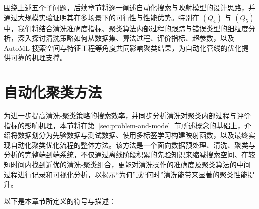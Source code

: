 \documentclass[10pt]{article} %
\numberwithin{equation}{section}
\begin{document}
\textcolor[rgb]{0.00,0.07,1.00}{围绕上述五个子问题，后续章节将逐一阐述自动化搜索与映射模型的设计思路，并通过大规模实验证明其在多场景下的可行性与性能优势。特别在 \((Q_4)\) 与 \((Q_5)\) 中，我们将结合清洗准确度指标、聚类算法内部过程的跟踪与错误类型的细粒度分析，深入探讨清洗策略如何从数据集、算法过程、评价指标、超参数，以及 AutoML 搜索空间与特征工程等角度共同影响聚类结果，为自动化管线的优化提供可靠的机理支撑。}  


\section{自动化聚类方法}
\label{sec:autoML}

为进一步提高清洗-聚类策略的搜索效率，并同步分析清洗对聚类内部过程与评价指标的影响机理，本节将在第~\ref{sec:problem-and-model} 节所述概念的基础上，介绍将数据划分为先验数据与测试数据、使用多标签学习构建映射函数，以及最终实现自动化聚类优化流程的整体方法。该方法是一个面向数据预处理、清洗、聚类与分析的完整端到端系统，不仅通过离线阶段积累的先验知识来缩减搜索空间、在较短时间内找到近优的清洗-聚类组合，更能对清洗操作的准确度及聚类算法的中间过程进行记录和可视化分析，以揭示“为何”或“何时”清洗能带来显著的聚类性能提升。

以下是本章节所定义的符号与描述：
\end{document}
